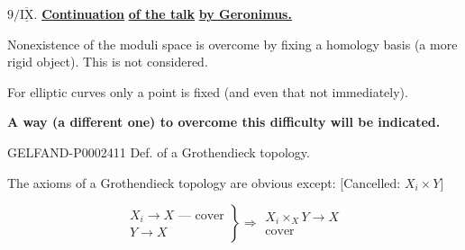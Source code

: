 


$9/\underline{\overline{\mathrm{IX}}}$.
\underline{\textbf{Continuation}} \underline{\textbf{of the talk}} \underline{\textbf{by Geronimus.}}



Nonexistence of the moduli space is overcome by fixing a homology basis (a more rigid object). This is not considered.



For elliptic curves only a point is fixed (and even that not immediately).



\textbf{A way (a different one) to overcome this difficulty will be indicated.}



\begin{GelfandAdjacentEvidence}{GELFAND-P000241}{1}
Def. of a Grothendieck topology.




\end{GelfandAdjacentEvidence}

The axioms of a Grothendieck topology are obvious except: [Cancelled: $X_i\times Y$]



\begin{equation*}
\left.\begin{gathered}X_i\longrightarrow X\text{ — cover}\\Y\longrightarrow X\end{gathered}\right\}
\Rightarrow\begin{gathered}X_i\times_X Y\longrightarrow X\\\text{cover}\end{gathered}
\end{equation*}



